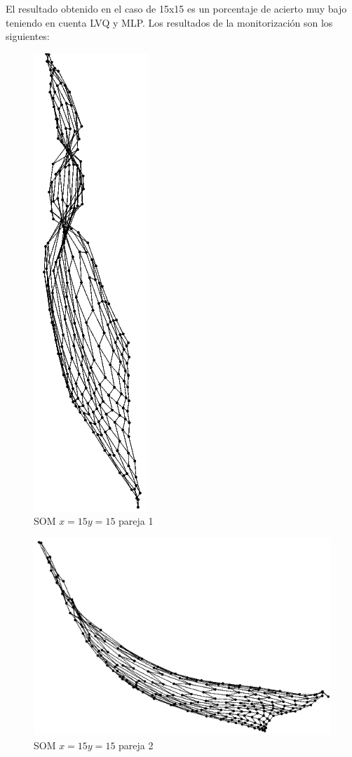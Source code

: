 \documentclass[11pt,spanish,listoffigures,listoftables]{workluis}
\begin{document}
\par El resultado obtenido en el caso de 15x15 es un porcentaje de acierto muy bajo teniendo en cuenta LVQ y MLP. Los resultados de la monitorización son los siguientes:

\begin{figure}[H]
\centering
\includegraphics[scale=0.5]{som1515p1}
\caption{SOM $x=15 y=15$ pareja 1}
\end{figure} 

\begin{figure}[H]
\centering
\includegraphics[scale=0.5]{som1515p2}
\caption{SOM $x=15 y=15$ pareja 2}
\end{figure} 
\end{document}
